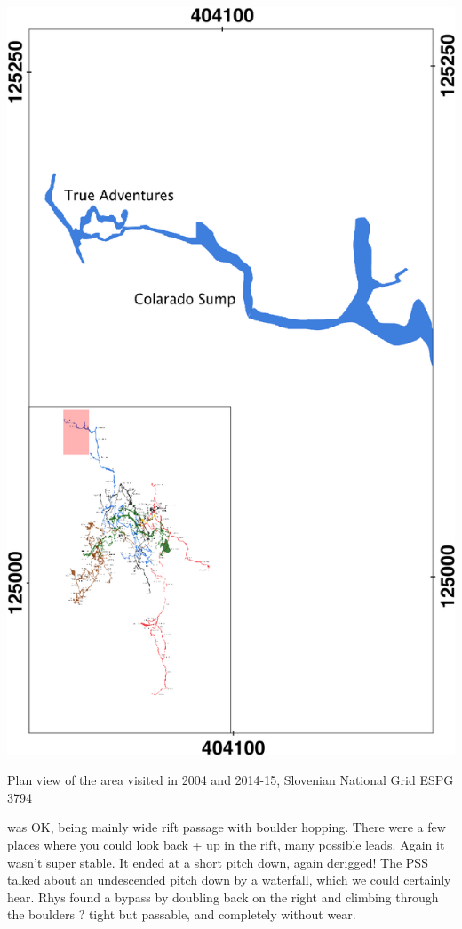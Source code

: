 \begin{marginfigure}
\checkoddpage \ifoddpage \forcerectofloat \else \forceversofloat \fi
\centering
 \includegraphics[width=\linewidth]{images/2014/jarv-2014/colarado_inset}
 \caption{Plan view of the \protect{} area visited in 2004 and 2014-15, Slovenian National Grid ESPG 3794}
 \label{colarado inset}
\end{marginfigure}

 was OK, being mainly wide rift passage with boulder hopping. There were a few places where you could look back + up in the rift, many possible leads. Again it wasn't super stable. It ended at a short pitch down, again derigged! The PSS talked about an undescended pitch down by a waterfall, which we could certainly hear.
Rhys found a bypass by doubling back on the right and climbing through the boulders ? tight but passable, and completely without wear.


